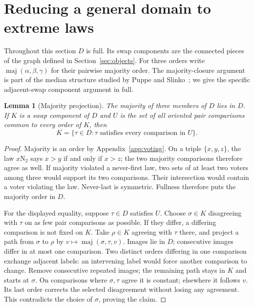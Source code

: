 \documentclass[11pt,letterpaper]{article}
\newtheorem{lemma}[theorem]{Lemma}
\theoremstyle{definition}
\newcommand{\maj}{\operatorname{maj}}
\newcommand{\N}[2]{#1\mathrm N_{#2}}
\begin{document}
\clearpage
\section{Reducing a general domain to extreme laws}\label{sec:components}
Throughout this section \(D\) is full. Its swap components are the
connected pieces of the graph defined in Section~\ref{sec:objects}. For
three orders write \(\maj(\alpha,\beta,\gamma)\) for their pairwise
majority order. The majority-closure argument is part of the median
structure studied by Puppe and Slinko~\cite{PuppeSlinko}; we give the
specific adjacent-swap component argument in full.

\begin{lemma}[Majority projection]\label{lem:projection}
The majority of three members of \(D\) lies in \(D\).
If \(K\) is a swap component of \(D\) and \(U\) is the set of all oriented
pair comparisons common to every order of \(K\), then
\[
 K=\{\tau\in D:\tau\text{ satisfies every comparison in }U\}.
\]
\end{lemma}
\begin{proof}
Majority is an order by Appendix~\ref{app:voting}. On a triple
\(\{x,y,z\}\), the law \(\N x2\) says \(x>y\) if and only if
\(x>z\); the two majority comparisons therefore agree as well.
If majority violated a never-first law, two sets of at least two
voters among three would support its two comparisons. Their intersection
would contain a voter violating the law. Never-last is symmetric.
Fullness therefore puts the majority order in \(D\).

For the displayed equality, suppose \(\tau\in D\) satisfies \(U\).
Choose \(\sigma\in K\) disagreeing with \(\tau\) on as few pair
comparisons as possible. If they differ, a differing comparison is not
fixed on \(K\). Take \(\rho\in K\) agreeing with \(\tau\) there,
and project a path from \(\sigma\) to \(\rho\) by
\(v\mapsto\maj(\sigma,\tau,v)\). Images lie in \(D\); consecutive
images differ in at most one comparison. Two distinct orders differing
in one comparison exchange adjacent labels: an intervening label would
force another comparison to change. Remove consecutive repeated images;
the remaining path stays in \(K\) and starts at \(\sigma\). On comparisons where \(\sigma,\tau\)
agree it is constant; elsewhere it follows \(v\). Its last order
corrects the selected disagreement without losing any agreement.
This contradicts the choice of \(\sigma\), proving the claim.
\end{proof}
\end{document}
